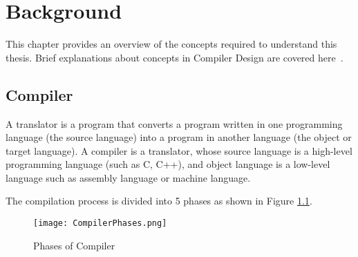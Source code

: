 \chapter{Background}
\label{chap:background}
This chapter provides an overview of the concepts required to understand this thesis. Brief explanations about concepts in Compiler Design are covered here~\cite{aho1977principles}.

\section{Compiler}
\label{sec:compiler}
A translator is a program that converts a program written in one programming language (the source language) into a program in another language (the object or target language). A compiler is a translator, whose source language is a high-level programming language (such as C, C++), and object language is a low-level language such as assembly language or machine language.

The compilation process is divided into 5 phases as shown in Figure \ref{fig:Compiler Phases}.
\begin{figure}
\centering
\texttt{[image: CompilerPhases.png]}
\caption{Phases of Compiler}
\label{fig:Compiler Phases}
\end{figure}

